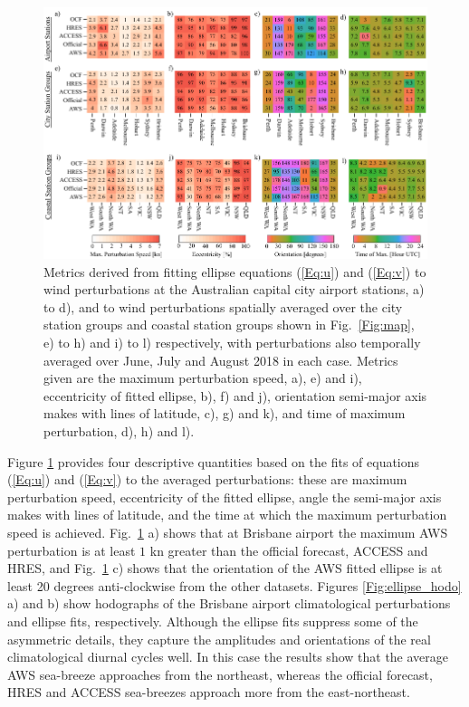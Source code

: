 \documentclass[twocol]{ametsoc}
\begin{document}
\begin{figure}
\centering
\includegraphics[width=39pc]{ellipse_fits.pdf}
\caption{Metrics derived from fitting ellipse equations (\ref{Eq:u}) and (\ref{Eq:v}) to wind perturbations at the Australian capital city airport stations, a) to d), and to wind perturbations spatially averaged over the city station groups and coastal station groups shown in Fig.~\ref{Fig:map}, e) to h) and i) to l) respectively, with perturbations also temporally averaged over June, July and August 2018 in each case. Metrics given are the maximum perturbation speed, a), e) and i), eccentricity of fitted ellipse, b), f) and j), orientation semi-major axis makes with lines of latitude, c), g) and k), and time of maximum perturbation, d), h) and l).}
\label{Fig:ellipse_fits}
\end{figure}

Figure \ref{Fig:ellipse_fits} provides four descriptive quantities based on the fits of equations (\ref{Eq:u}) and (\ref{Eq:v}) to the averaged perturbations: these are maximum perturbation speed, eccentricity of the fitted ellipse, angle the semi-major axis makes with lines of latitude, and the time at which the maximum perturbation speed is achieved. Fig.~\ref{Fig:ellipse_fits} a) shows that at Brisbane airport the maximum AWS perturbation is at least $1$ kn greater than the official forecast, ACCESS and HRES, and Fig.~\ref{Fig:ellipse_fits} c) shows that the orientation of the AWS fitted ellipse is at least 20 degrees anti-clockwise from the other datasets. Figures \ref{Fig:ellipse_hodo} a) and b) show hodographs of the Brisbane airport climatological perturbations and ellipse fits, respectively. Although the ellipse fits suppress some of the asymmetric details, they capture the amplitudes and orientations of the real climatological diurnal cycles well. In this case the results show that the average AWS sea-breeze approaches from the northeast, whereas the official forecast, HRES and ACCESS sea-breezes approach more from the east-northeast. 
\end{document}
